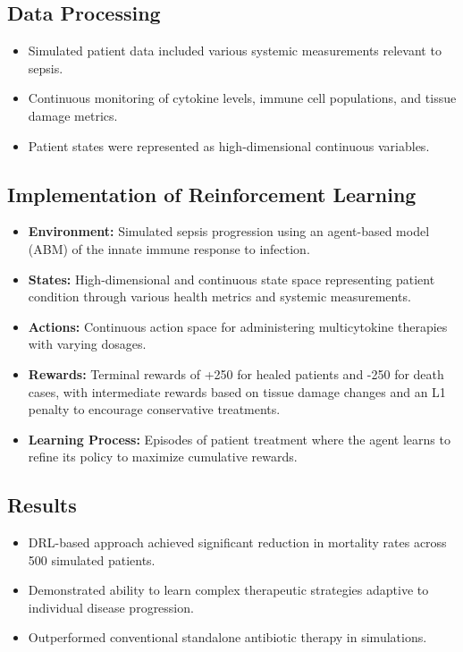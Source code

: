 \subsection*{Data Processing}
\begin{itemize}
    \item Simulated patient data included various systemic measurements relevant to sepsis.
    \item Continuous monitoring of cytokine levels, immune cell populations, and tissue damage metrics.
    \item Patient states were represented as high-dimensional continuous variables.
\end{itemize}

\subsection*{Implementation of Reinforcement Learning}
\begin{itemize}
    \item \textbf{Environment:} Simulated sepsis progression using an agent-based model (ABM) of the innate immune response to infection.
    \item \textbf{States:} High-dimensional and continuous state space representing patient condition through various health metrics and systemic measurements.
    \item \textbf{Actions:} Continuous action space for administering multicytokine therapies with varying dosages.
    \item \textbf{Rewards:} Terminal rewards of +250 for healed patients and -250 for death cases, with intermediate rewards based on tissue damage changes and an L1 penalty to encourage conservative treatments.
    \item \textbf{Learning Process:} Episodes of patient treatment where the agent learns to refine its policy to maximize cumulative rewards.
\end{itemize}

\subsection*{Results}
\begin{itemize}
    \item DRL-based approach achieved significant reduction in mortality rates across 500 simulated patients.
    \item Demonstrated ability to learn complex therapeutic strategies adaptive to individual disease progression.
    \item Outperformed conventional standalone antibiotic therapy in simulations.
\end{itemize}

